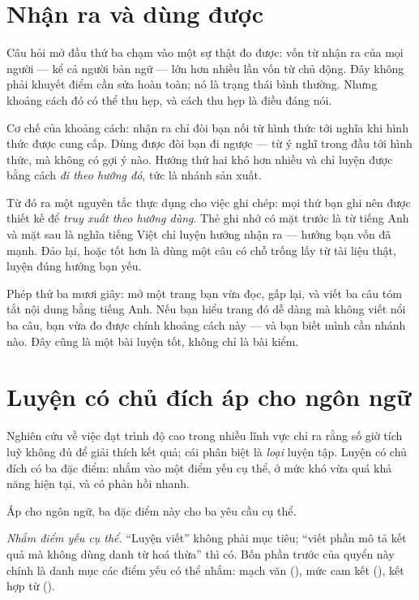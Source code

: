 \documentclass[../../english.tex]{subfiles}
\begin{document}
\section{Nhận ra và dùng được}

Câu hỏi mở đầu thứ ba chạm vào một sự thật đo được: vốn từ nhận ra của mọi người --- kể cả người bản ngữ --- lớn hơn nhiều lần vốn từ chủ động. Đây không phải khuyết điểm cần sửa hoàn toàn; nó là trạng thái bình thường. Nhưng khoảng cách đó có thể thu hẹp, và cách thu hẹp là điều đáng nói.

Cơ chế của khoảng cách: nhận ra chỉ đòi bạn nối từ hình thức tới nghĩa khi hình thức được cung cấp. Dùng được đòi bạn đi ngược --- từ ý nghĩ trong đầu tới hình thức, mà không có gợi ý nào. Hướng thứ hai khó hơn nhiều và chỉ luyện được bằng cách \emph{đi theo hướng đó}, tức là nhánh sản xuất.

Từ đó ra một nguyên tắc thực dụng cho việc ghi chép: mọi thứ bạn ghi nên được thiết kế để \emph{truy xuất theo hướng dùng}. Thẻ ghi nhớ có mặt trước là từ tiếng Anh và mặt sau là nghĩa tiếng Việt chỉ luyện hướng nhận ra --- hướng bạn vốn đã mạnh. Đảo lại, hoặc tốt hơn là dùng một câu có chỗ trống lấy từ tài liệu thật, luyện đúng hướng bạn yếu.

\begin{cannho}
Phép thử ba mươi giây: mở một trang bạn vừa đọc, gấp lại, và viết ba câu tóm tắt nội dung bằng tiếng Anh. Nếu bạn hiểu trang đó dễ dàng mà không viết nổi ba câu, bạn vừa đo được chính khoảng cách này --- và bạn biết mình cần nhánh nào. Đây cũng là một bài luyện tốt, không chỉ là bài kiểm.
\end{cannho}

\section{Luyện có chủ đích áp cho ngôn ngữ}

Nghiên cứu về việc đạt trình độ cao trong nhiều lĩnh vực chỉ ra rằng số giờ tích luỹ không đủ để giải thích kết quả; cái phân biệt là \emph{loại} luyện tập. Luyện có chủ đích có ba đặc điểm: nhắm vào một điểm yếu cụ thể, ở mức khó vừa quá khả năng hiện tại, và có phản hồi nhanh.

Áp cho ngôn ngữ, ba đặc điểm này cho ba yêu cầu cụ thể.

\emph{Nhắm điểm yếu cụ thể.} ``Luyện viết'' không phải mục tiêu; ``viết phần mô tả kết quả mà không dùng danh từ hoá thừa'' thì có. Bốn phần trước của quyển này chính là danh mục các điểm yếu có thể nhắm: mạch văn (), mức cam kết (), kết hợp từ ().
\end{document}
